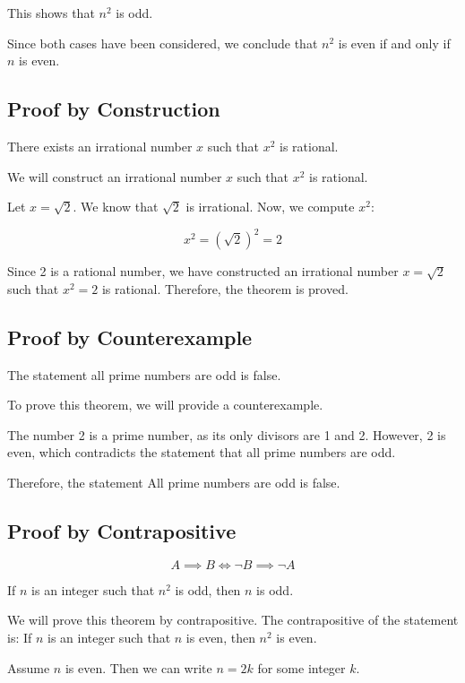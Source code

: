 This shows that \( n^2 \) is odd.

Since both cases have been considered, we conclude that \( n^2 \) is even if and only if \(n\) is even.

\QED

\subsection{Proof by Construction}

There exists an irrational number \(x\) such that \( x^2 \) is rational.

We will construct an irrational number \(x\) such that \( x^2 \) is rational.

Let \( x = \sqrt{2} \). We know that \( \sqrt{2} \) is irrational. Now, we compute \( x^2 \):
	
\[
	x^2 = (\sqrt{2})^2 = 2
\]
	
Since 2 is a rational number, we have constructed an irrational number \( x = \sqrt{2} \) such 
that \( x^2 = 2 \) is rational. Therefore, the theorem is proved.

\QED

\subsection{Proof by Counterexample}

The statement all prime numbers are odd is false.

To prove this theorem, we will provide a counterexample.

The number 2 is a prime number, as its only divisors are 1 and 2. However, 2 is 
even, which contradicts the statement that all prime numbers are odd.

Therefore, the statement All prime numbers are odd is false.

\QED

\subsection{Proof by Contrapositive}

\[
	A \implies B \iff \neg B \implies \neg A
\]

If \(n\) is an integer such that \( n^2 \) is odd, then \(n\) is odd.

We will prove this theorem by contrapositive. The contrapositive of the statement is: If \(n\) is an 
integer such that \(n\) is even, then \( n^2 \) is even.

Assume \(n\) is even. Then we can write \( n = 2k \) for some integer \(k\).

